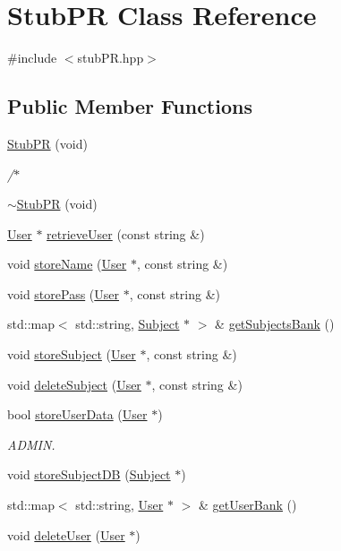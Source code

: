 \hypertarget{class_stub_p_r}{}\section{Stub\+PR Class Reference}
\label{class_stub_p_r}


{\ttfamily \#include $<$stub\+P\+R.\+hpp$>$}

\subsection*{Public Member Functions}
\begin{DoxyCompactItemize}
\item 
\hyperlink{class_stub_p_r_a422b75cc6a8e871a498e9d72fb7dc499}{Stub\+PR} (void)
\begin{DoxyCompactList}\small\item\em /$\ast$ \end{DoxyCompactList}\item 
\hyperlink{class_stub_p_r_a7b4922deef97a21ae44ad91df316c51e}{$\sim$\+Stub\+PR} (void)
\item 
\hyperlink{class_user}{User} $\ast$ \hyperlink{class_stub_p_r_a9a422786005387ec3eebd751fba4d065}{retrieve\+User} (const string \&)
\item 
void \hyperlink{class_stub_p_r_a17e7dc40468374e5b7cc01de19dcd0ed}{store\+Name} (\hyperlink{class_user}{User} $\ast$, const string \&)
\item 
void \hyperlink{class_stub_p_r_a1974be3ce48be29f04ba798a86d33d4b}{store\+Pass} (\hyperlink{class_user}{User} $\ast$, const string \&)
\item 
std\+::map$<$ std\+::string, \hyperlink{class_subject}{Subject} $\ast$ $>$ \& \hyperlink{class_stub_p_r_a16c53dfcc357d1aed6070b53a55590e2}{get\+Subjects\+Bank} ()
\item 
void \hyperlink{class_stub_p_r_a15dca263137dd3a1d9d107bad2053a4c}{store\+Subject} (\hyperlink{class_user}{User} $\ast$, const string \&)
\item 
void \hyperlink{class_stub_p_r_aa15daf429eb5f67810998dd9fc9549af}{delete\+Subject} (\hyperlink{class_user}{User} $\ast$, const string \&)
\item 
bool \hyperlink{class_stub_p_r_ada02f504375eb2d769687fd33c520db1}{store\+User\+Data} (\hyperlink{class_user}{User} $\ast$)
\begin{DoxyCompactList}\small\item\em A\+D\+M\+IN. \end{DoxyCompactList}\item 
void \hyperlink{class_stub_p_r_a771618cef296522de86a06bca2a56b58}{store\+Subject\+DB} (\hyperlink{class_subject}{Subject} $\ast$)
\item 
std\+::map$<$ std\+::string, \hyperlink{class_user}{User} $\ast$ $>$ \& \hyperlink{class_stub_p_r_a207ac73b07ca1512135e9bcf8392930c}{get\+User\+Bank} ()
\item 
void \hyperlink{class_stub_p_r_a233d8c7bb7d5b433c8581e4d85d01884}{delete\+User} (\hyperlink{class_user}{User} $\ast$)
\end{DoxyCompactItemize}


